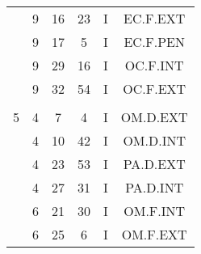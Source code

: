 \documentclass[12pt, a4paper]{article}
\begin{document}
\begin{multicols}{3}
{\begin{tabular}{c c c c c c}
	 	 	 	 & 9 & 16 & 23 & I & EC.F.EXT\\%
	 	 	 	 & 9 & 17 & 5 & I & EC.F.PEN\\%
	 	 	 	 & 9 & 29 & 16 & I & OC.F.INT\\%
	 	 	 	 & 9 & 32 & 54 & I & OC.F.EXT\\%
	 	 	 	 & & & & & \\%
	 	 	 	5 & 4 & 7 & 4 & I & OM.D.EXT\\%
	 	 	 	 & 4 & 10 & 42 & I & OM.D.INT\\%
	 	 	 	 & 4 & 23 & 53 & I & PA.D.EXT\\%
	 	 	 	 & 4 & 27 & 31 & I & PA.D.INT\\%
	 	 	 	 & 6 & 21 & 30 & I & OM.F.INT\\%
	 	 	 	 & 6 & 25 & 6 & I & OM.F.EXT\\%
	 	 \end{tabular}
 	}
\end{multicols}
\end{document}
